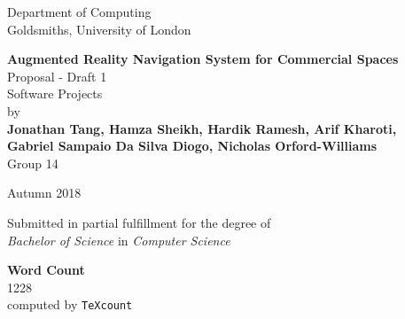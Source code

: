 \documentclass[12pt]{report}
\newcommand\blankpage{%
    \null
    \thispagestyle{empty}%
    \addtocounter{page}{-1}%
    \newpage}
\begin{document}
\begin{titlepage}
    \begin{center}
        \vspace*{1cm}
        Department of Computing\\
        Goldsmiths, University of London\\

        \vspace*{3.75cm}

        \textbf{\Large Augmented Reality Navigation System for Commercial Spaces}\\
        \vspace*{0.25cm}           
        Proposal - Draft 1\\
        Software Projects\\  

        \vspace*{2cm}
        by\\
        \vspace*{0.25cm}    
        \textbf{Jonathan Tang, Hamza Sheikh, Hardik Ramesh, Arif Kharoti,\\}
        \textbf{Gabriel Sampaio Da Silva Diogo, Nicholas Orford-Williams}\\
        \vspace*{0.1cm}    
        Group 14

        \vspace{2cm}

        Autumn 2018
        \vfill

        Submitted in partial fulfillment for the degree of\\
        \textit{Bachelor of Science} in \textit{Computer Science}

        \vspace{1.5cm}

    \end{center}
\end{titlepage}
\afterpage{\blankpage}
\thispagestyle{plain}

\begin{center}    
    \large
    \textbf{Word Count}\\
    1228\\
    computed by \texttt{TeXcount}
\end{center}
\end{document}
